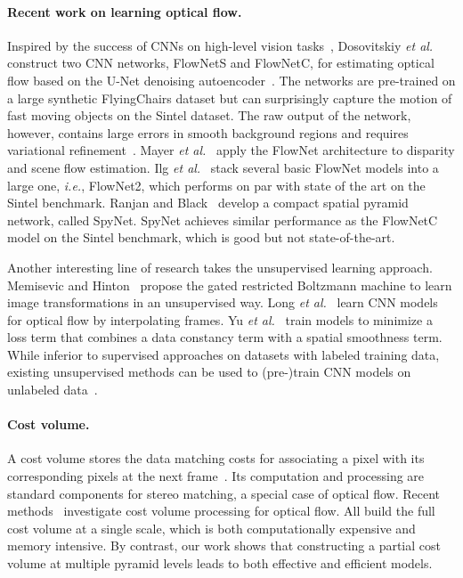 \documentclass[10pt,journal,cspaper,compsoc]{IEEEtran}
\def\ie{\emph{i.e.}\xspace} \def\Ie{\emph{I.e.}\xspace}
\def\etal{\emph{et al.}\xspace}
\newcommand{\beforePara}{\vspace{-0em}}
\begin{document}
	\paragraph{Recent work on learning optical flow.}
	Inspired by the success of CNNs on high-level vision tasks~\cite{krizhevsky2012imagenet}, Dosovitskiy \etal~\cite{Dosovitskiy:2015Flownet}
	construct two CNN networks, FlowNetS and FlowNetC, for estimating optical flow based on the U-Net denoising autoencoder~\cite{ronneberger2015u}.
	The networks are pre-trained on a large synthetic FlyingChairs dataset but  can surprisingly capture the motion of fast moving objects on the Sintel dataset.
	The raw output of the network, however, contains large errors in smooth background regions and requires variational refinement~\cite{Brox:LDOF:2011}. 
	Mayer \etal~\cite{Mayer:2016:Large}  apply the FlowNet architecture to disparity and scene flow estimation.
	Ilg \etal~\cite{Ilg:2016:Flownet2} stack several basic FlowNet models into a large one, \ie, FlowNet2, which performs on par with state of the art on the Sintel benchmark. 
	Ranjan and Black~\cite{Ranjan:2016:SpyNet} develop a compact spatial pyramid network, called SpyNet. SpyNet achieves similar performance as the FlowNetC model on the Sintel benchmark, which is good but not state-of-the-art.
	
	Another interesting line of research takes the unsupervised learning approach.  Memisevic and Hinton~\cite{Memisevic:2007:Unsupervised} propose the gated restricted Boltzmann machine to learn image transformations in an unsupervised way. Long \etal~\cite{Long:2016:Learning} learn CNN models for optical flow by interpolating frames. Yu \etal~\cite{YuHD16} train models to minimize a loss term that combines a data constancy term with a spatial smoothness term. While inferior to supervised approaches on datasets with labeled training data, existing unsupervised methods can be used to (pre-)train CNN models on unlabeled data~\cite{Lai2017SemiFlowGAN}.  
	
	\beforePara
	\paragraph{Cost volume.} A cost volume stores the data matching costs for associating a pixel with its corresponding pixels at the next frame~\cite{Hosni2013Fast}. Its computation and processing are standard components for stereo matching, a special case of optical flow. Recent methods~\cite{Chen2016Full,Dosovitskiy:2015Flownet,Xu2017Accurate} investigate cost volume processing for optical flow. All build the full cost volume at a single scale, which is both computationally expensive and memory intensive. By contrast, our work shows that constructing a partial cost volume at multiple pyramid levels leads to both effective and efficient models.
\end{document}
